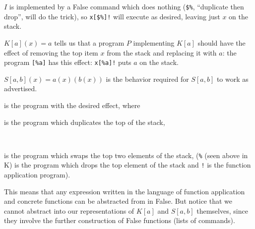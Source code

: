 \documentclass[12pt]{article}
\begin{document}
$I$ is implemented by a False command which does nothing ({\tt \$\%},
``duplicate then drop'', will do the trick), so {\tt x[\$\%]!} will
execute as desired, leaving just $x$ on the stack.

$K[a](x) = a$ tells us that a program $P$ implementing $K[a]$ should
have the effect of removing the top item $x$ from the stack and
replacing it with $a$: the program {\tt [\%a]} has this effect:
{\tt x[\%a]!} puts $a$ on the stack.

$S[a,b](x) = a(x)(b(x))$ is the behavior required for $S[a,b]$
to work as advertised. \begin{verb} [$b!\a!!] \end{verb} is the program with the desired
effect, where \begin{verb} $ \end{verb} is the program which duplicates the top of the stack,
\begin{verb} \ \end{verb} is the program which swaps the top two elements of the stack,
({\tt \%} (seen above in K) is the program which drops the top element
of the stack and {\tt !} is the function application program).

This means that any expression written in the language of function
application and concrete functions can be abstracted from in False.  But notice
that we cannot abstract into our representations of $K[a]$ and
$S[a,b]$ themselves, since they involve the further construction of
False functions (lists of commands).  
\end{document}
